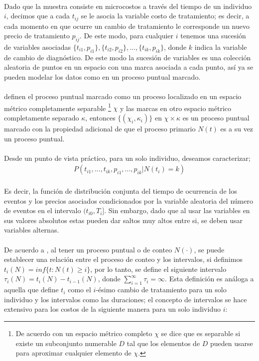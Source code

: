 \\
Dado que la muestra consiste en microcostos a trav\'es del tiempo de un individuo $i$, decimos que a cada $t_{ij}$ se le asocia la variable costo de tratamiento; es decir, a cada momento en que ocurre un cambio de tratamiento le corresponde un nuevo precio de tratamiento $p_{ij}$. De este modo, para cualquier $i$ tenemos una sucesi\'on de variables asociadas $\{t_{i1},p_{i1}\},\{t_{i2},p_{i2}\},...,\{t_{ik},p_{ik}\}$, donde $k$ indica la variable de cambio de diagn\'ostico. De este modo la sucesi\'on de variables es una colecci\'on aleatoria de puntos en un espacio con una marca asociada a cada punto, as\'i ya se pueden modelar los datos como en un proceso puntual marcado.\\
\\
\cite{daley2003} definen el proceso puntual marcado como un proceso localizado en un espacio m\'etrico completamente separable \footnote{De acuerdo con \cite{schervish2012theory} un espacio m\'etrico completo $\chi$ se dice que es separable si existe un subconjunto numerable $D$ tal que los elementos de $D$ pueden usarse para aproximar cualquier elemento de $\chi$.} $\chi$ y las marcas en otro espacio m\'etrico completamente separado $\kappa$, entonces $\{(\chi_i,\kappa_i)\}$ en $\chi \times \kappa$ es un proceso puntual marcado con la propiedad adicional de que el proceso primario $N(t)$ es a su vez un proceso puntual.\\
\\
Desde un punto de vista pr\'actico, para un solo individuo, deseamos caracterizar;
\begin{align}
P(t_{i1},...,t_{ik},p_{i1},...,p_{ik}|N(t_i)=k)
\end{align}
\\
Es decir, la funci\'on de distribuci\'on conjunta del tiempo de ocurrencia de los eventos y los precios asociados condicionados por la variable aleatoria del n\'umero de eventos en el intervalo $(t_{i0},T_i]$. Sin embargo, dado que al usar las variables en sus valores absolutos estas pueden dar saltos muy altos entre si, se deben usar variables alternas.\\
\\
De acuerdo a \cite{daley2003}, al tener un proceso puntual o de conteo $N(\cdot)$, se puede establecer una relaci\'on entre el proceso de conteo y los intervalos, si definimos $t_i(N)=inf\{t:N(t) \geq i\}$, por lo tanto, se define el siguiente intervalo $\tau_i(N)=t_i(N)-t_{i-1}(N)$, donde $\sum_{i=1}^\infty \tau_i=\infty$. Esta definici\'on es an\'aloga a aquella que define $t_i$ como el $i$-\'esimo cambio de tratamiento para un solo individuo y los intervalos como las duraciones; el concepto de intervalos se hace extensivo para los costos de la siguiente manera para un solo individuo $i$:
